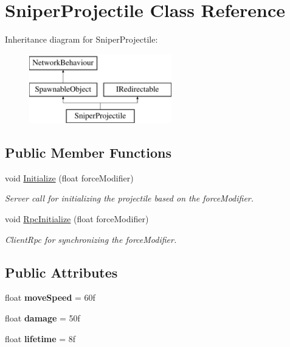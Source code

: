 \hypertarget{class_sniper_projectile}{}\section{Sniper\+Projectile Class Reference}
\label{class_sniper_projectile}
Inheritance diagram for Sniper\+Projectile\+:\begin{figure}[H]
\begin{center}
\leavevmode
\includegraphics[height=3.000000cm]{class_sniper_projectile}
\end{center}
\end{figure}
\subsection*{Public Member Functions}
\begin{DoxyCompactItemize}
\item 
void \hyperlink{class_sniper_projectile_af684c23f2980a8cb1305acac888a0413}{Initialize} (float force\+Modifier)
\begin{DoxyCompactList}\small\item\em Server call for initializing the projectile based on the force\+Modifier. \end{DoxyCompactList}\item 
void \hyperlink{class_sniper_projectile_a0c84fa60ff4f788bb94f6c810ab59570}{Rpc\+Initialize} (float force\+Modifier)
\begin{DoxyCompactList}\small\item\em Client\+Rpc for synchronizing the force\+Modifier. \end{DoxyCompactList}\end{DoxyCompactItemize}
\subsection*{Public Attributes}
\begin{DoxyCompactItemize}
\item 
\hypertarget{class_sniper_projectile_aefcd2db071d92c236f231533fb59984c}{}\label{class_sniper_projectile_aefcd2db071d92c236f231533fb59984c} 
float {\bfseries move\+Speed} = 60f
\item 
\hypertarget{class_sniper_projectile_afedf8acc88c76e76323cfea1e3a7a00d}{}\label{class_sniper_projectile_afedf8acc88c76e76323cfea1e3a7a00d} 
float {\bfseries damage} = 50f
\item 
\hypertarget{class_sniper_projectile_a3a5cba9e72f9c3e1e7a5dd60e2d0ee38}{}\label{class_sniper_projectile_a3a5cba9e72f9c3e1e7a5dd60e2d0ee38} 
float {\bfseries lifetime} = 8f
\end{DoxyCompactItemize}
